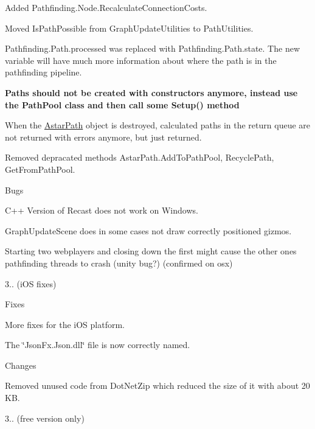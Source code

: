 \begin{DoxyItemize}
\begin{DoxyItemize}
\begin{DoxyItemize}
\item Added Pathfinding.\+Node.\+Recalculate\+Connection\+Costs.
\item Moved Is\+Path\+Possible from Graph\+Update\+Utilities to Path\+Utilities.
\item Pathfinding.\+Path.\+processed was replaced with Pathfinding.\+Path.\+state. The new variable will have much more information about where the path is in the pathfinding pipeline.
\item {\bfseries{Paths should not be created with constructors anymore, instead use the Path\+Pool class and then call some Setup() method}}
\item When the \mbox{\hyperlink{class_astar_path}{Astar\+Path}} object is destroyed, calculated paths in the return queue are not returned with errors anymore, but just returned.
\item Removed depracated methods Astar\+Path.\+Add\+To\+Path\+Pool, Recycle\+Path, Get\+From\+Path\+Pool.
\end{DoxyItemize}
\item Bugs
\begin{DoxyItemize}
\item C++ Version of Recast does not work on Windows.
\item Graph\+Update\+Scene does in some cases not draw correctly positioned gizmos.
\item Starting two webplayers and closing down the first might cause the other one\textquotesingle{}s pathfinding threads to crash (unity bug?) (confirmed on osx)
\end{DoxyItemize}
\end{DoxyItemize}
\item 3.. (i\+OS fixes)
\begin{DoxyItemize}
\item Fixes
\begin{DoxyItemize}
\item More fixes for the i\+OS platform.
\item The \char`\"{}\+Json\+Fx.\+Json.\+dll\char`\"{} file is now correctly named.
\end{DoxyItemize}
\item Changes
\begin{DoxyItemize}
\item Removed unused code from Dot\+Net\+Zip which reduced the size of it with about 20 KB.
\end{DoxyItemize}
\end{DoxyItemize}
\item 3.. (free version only)

\end{DoxyItemize}
